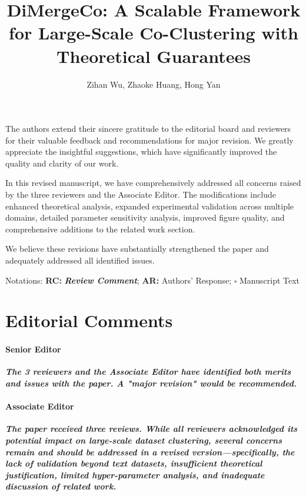 \documentclass{ar2rc}
\title{
DiMergeCo: A Scalable Framework for Large-Scale Co-Clustering with Theoretical Guarantees}
\author{Zihan Wu, Zhaoke Huang, Hong Yan}
\theoremstyle{definition}
\theoremstyle{remark} %
\begin{document}
\maketitle

\noindent
The authors extend their sincere gratitude to the editorial board and reviewers for their valuable feedback and recommendations for major revision. We greatly appreciate the insightful suggestions, which have significantly improved the quality and clarity of our work.

In this revised manuscript, we have comprehensively addressed all concerns raised by the three reviewers and the Associate Editor. The modifications include enhanced theoretical analysis, expanded experimental validation across multiple domains, detailed parameter sensitivity analysis, improved figure quality, and comprehensive additions to the related work section.

We believe these revisions have substantially strengthened the paper and adequately addressed all identified issues.

Notations: \textbf{RC:} \textbf{\color{blue}\textit{Review Comment}}; \textbf{AR:} Authors' Response; $\square$ Manuscript Text


\section{Editorial Comments}

\paragraph{Senior Editor} \textbf{\color{blue}\textit{The 3 reviewers and the Associate Editor have identified both merits and issues with the paper. A "major revision" would be recommended.}}

\paragraph{Associate Editor} \textbf{\color{blue}\textit{The paper received three reviews. While all reviewers acknowledged its potential impact on large-scale dataset clustering, several concerns remain and should be addressed in a revised version—specifically, the lack of validation beyond text datasets, insufficient theoretical justification, limited hyper-parameter analysis, and inadequate discussion of related work.}}
\end{document}
